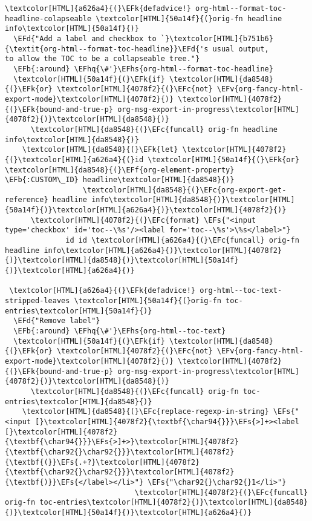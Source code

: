 \documentclass{scrartcl}
\newcommand{\EFk}[1]{\textcolor{EFk}{#1}} %
\newcommand{\EFd}[1]{\textcolor{EFd}{\textit{#1}}} %
\newcommand{\EFs}[1]{\textcolor{EFs}{#1}} %
\newcommand{\EFb}[1]{\textcolor{EFb}{#1}} %
\newcommand{\EFc}[1]{\textcolor{EFc}{#1}} %
\newcommand{\EFv}[1]{\textcolor{EFv}{#1}} %
\newcommand{\EFf}[1]{\textcolor{EFf}{#1}} %
\newcommand{\EFhq}[1]{\textcolor{EFhq}{#1}} %
\newcommand{\EFhs}[1]{\textcolor{EFhs}{#1}} %
\begin{document}
\begin{Code}
\begin{Verbatim}[]
\textcolor[HTML]{a626a4}{(}\EFk{defadvice!} org-html--format-toc-headline-colapseable \textcolor[HTML]{50a14f}{(}orig-fn headline info\textcolor[HTML]{50a14f}{)}
  \EFd{"Add a label and checkbox to `}\textcolor[HTML]{b751b6}{\textit{org-html--format-toc-headline}}\EFd{'s usual output,
to allow the TOC to be a collapseable tree."}
  \EFb{:around} \EFhq{\#'}\EFhs{org-html--format-toc-headline}
  \textcolor[HTML]{50a14f}{(}\EFk{if} \textcolor[HTML]{da8548}{(}\EFk{or} \textcolor[HTML]{4078f2}{(}\EFc{not} \EFv{org-fancy-html-export-mode}\textcolor[HTML]{4078f2}{)} \textcolor[HTML]{4078f2}{(}\EFk{bound-and-true-p} org-msg-export-in-progress\textcolor[HTML]{4078f2}{)}\textcolor[HTML]{da8548}{)}
      \textcolor[HTML]{da8548}{(}\EFc{funcall} orig-fn headline info\textcolor[HTML]{da8548}{)}
    \textcolor[HTML]{da8548}{(}\EFk{let} \textcolor[HTML]{4078f2}{(}\textcolor[HTML]{a626a4}{(}id \textcolor[HTML]{50a14f}{(}\EFk{or} \textcolor[HTML]{da8548}{(}\EFf{org-element-property} \EFb{:CUSTOM\_ID} headline\textcolor[HTML]{da8548}{)}
                  \textcolor[HTML]{da8548}{(}\EFc{org-export-get-reference} headline info\textcolor[HTML]{da8548}{)}\textcolor[HTML]{50a14f}{)}\textcolor[HTML]{a626a4}{)}\textcolor[HTML]{4078f2}{)}
      \textcolor[HTML]{4078f2}{(}\EFc{format} \EFs{"<input type='checkbox' id='toc--\%s'/><label for='toc--\%s'>\%s</label>"}
              id id \textcolor[HTML]{a626a4}{(}\EFc{funcall} orig-fn headline info\textcolor[HTML]{a626a4}{)}\textcolor[HTML]{4078f2}{)}\textcolor[HTML]{da8548}{)}\textcolor[HTML]{50a14f}{)}\textcolor[HTML]{a626a4}{)}

 \textcolor[HTML]{a626a4}{(}\EFk{defadvice!} org-html--toc-text-stripped-leaves \textcolor[HTML]{50a14f}{(}orig-fn toc-entries\textcolor[HTML]{50a14f}{)}
  \EFd{"Remove label"}
  \EFb{:around} \EFhq{\#'}\EFhs{org-html--toc-text}
  \textcolor[HTML]{50a14f}{(}\EFk{if} \textcolor[HTML]{da8548}{(}\EFk{or} \textcolor[HTML]{4078f2}{(}\EFc{not} \EFv{org-fancy-html-export-mode}\textcolor[HTML]{4078f2}{)} \textcolor[HTML]{4078f2}{(}\EFk{bound-and-true-p} org-msg-export-in-progress\textcolor[HTML]{4078f2}{)}\textcolor[HTML]{da8548}{)}
      \textcolor[HTML]{da8548}{(}\EFc{funcall} orig-fn toc-entries\textcolor[HTML]{da8548}{)}
    \textcolor[HTML]{da8548}{(}\EFc{replace-regexp-in-string} \EFs{"<input [}\textcolor[HTML]{4078f2}{\textbf{\char94{}}}\EFs{>]+><label [}\textcolor[HTML]{4078f2}{\textbf{\char94{}}}\EFs{>]+>}\textcolor[HTML]{4078f2}{\textbf{\char92{}\char92{}}}\textcolor[HTML]{4078f2}{\textbf{(}}\EFs{.+?}\textcolor[HTML]{4078f2}{\textbf{\char92{}\char92{}}}\textcolor[HTML]{4078f2}{\textbf{)}}\EFs{</label></li>"} \EFs{"\char92{}\char92{}1</li>"}
                              \textcolor[HTML]{4078f2}{(}\EFc{funcall} orig-fn toc-entries\textcolor[HTML]{4078f2}{)}\textcolor[HTML]{da8548}{)}\textcolor[HTML]{50a14f}{)}\textcolor[HTML]{a626a4}{)}


\end{Verbatim}
\end{Code}
\end{document}
